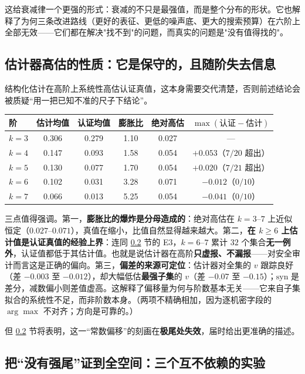 \documentclass[10.5pt,compsoc,UTF8]{CjC}
\theoremstyle{mystyle}
\begin{document}
这给衰减律一个更强的形式：衰减的不只是最强值，而是整个分布的形状。它也解释了为何三条改进路线（更好的表征、更低的噪声底、更大的搜索预算）在六阶上全部无效——它们都在解决"找不到"的问题，而真实的问题是"没有值得找的"。

\subsection{估计器高估的性质：它是保守的，且随阶失去信息}
\label{sec:bias}

结构化估计在高阶上系统性高估认证真值，这本身需要交代清楚，否则前述结论会被质疑“用一把已知不准的尺子下结论”。

\begin{center}
\begin{tabular}{lccccc}
\toprule
阶 & 估计均值 & 认证均值 & 膨胀比 & 绝对高估 & $\max(\text{认证}-\text{估计})$\\
\midrule
$k=3$ & 0.306 & 0.279 & 1.10 & 0.027 & ---\\
$k=4$ & 0.147 & 0.093 & 1.58 & 0.054 & $+0.053$（$7/20$ 超出）\\
$k=5$ & 0.130 & 0.077 & 1.70 & 0.054 & $+0.020$（$7/21$ 超出）\\
$k=6$ & 0.102 & 0.031 & 3.28 & 0.071 & $\boldsymbol{-0.012}$（$0/10$）\\
$k=7$ & 0.066 & 0.013 & 5.25 & 0.054 & $\boldsymbol{-0.041}$（$0/10$）\\
\bottomrule
\end{tabular}
\end{center}

三点值得强调。第一，\textbf{膨胀比的爆炸是分母造成的}：绝对高估在 $k=3$--$7$ 上近似恒定（$0.027$--$0.071$），真值在缩小，比值自然显得越来越大。第二，\textbf{在 $k\ge6$ 上估计值是认证真值的经验上界}：连同 \ref{sec:fullspace} 节的 E3，$k=6$--$7$ 累计 $32$ 个集合\textbf{无一例外}，认证值都低于其估计值。也就是说估计器在高阶\textbf{只虚报、不漏报}——对安全审计而言这是正确的偏向。第三，\textbf{偏差的来源可定位}：估计器对全集的 $v$ 跟踪良好（差 $-0.003$ 至 $-0.012$），却大幅低估\textbf{最强子集}的 $v$（差 $-0.07$ 至 $-0.15$）；$\mathrm{syn}$ 是差分，减数偏小则差值虚高。这解释了偏移量为何与阶数基本无关——它来自子集拟合的系统性不足，而非阶数本身。（两项不精确相加，因为逐机密字段的 $\arg\max$ 不对齐；方向是可靠的。）

但 \ref{sec:fullspace} 节将表明，这一“常数偏移”的刻画在\textbf{极尾处失效}，届时给出更准确的描述。

\subsection{把“没有强尾”证到全空间：三个互不依赖的实验}
\label{sec:fullspace}
\end{document}
